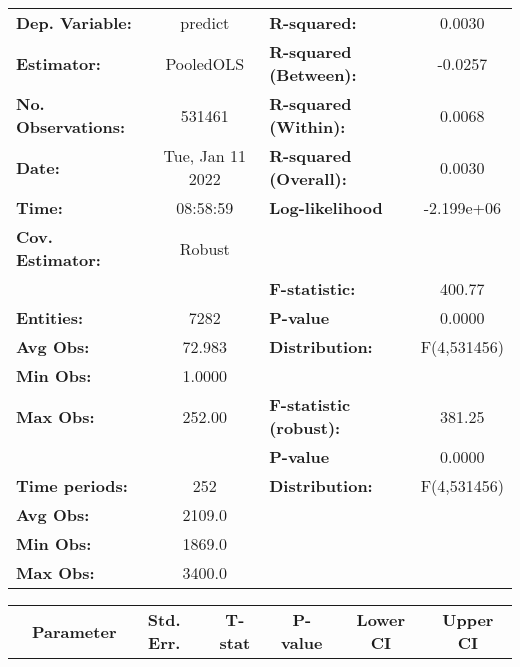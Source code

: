 \begin{center}
\begin{tabular}{lclc}
\toprule
\textbf{Dep. Variable:}    &      predict       & \textbf{  R-squared:         }   &      0.0030      \\
\textbf{Estimator:}        &     PooledOLS      & \textbf{  R-squared (Between):}  &     -0.0257      \\
\textbf{No. Observations:} &       531461       & \textbf{  R-squared (Within):}   &      0.0068      \\
\textbf{Date:}             &  Tue, Jan 11 2022  & \textbf{  R-squared (Overall):}  &      0.0030      \\
\textbf{Time:}             &      08:58:59      & \textbf{  Log-likelihood     }   &    -2.199e+06    \\
\textbf{Cov. Estimator:}   &       Robust       & \textbf{                     }   &                  \\
\textbf{}                  &                    & \textbf{  F-statistic:       }   &      400.77      \\
\textbf{Entities:}         &        7282        & \textbf{  P-value            }   &      0.0000      \\
\textbf{Avg Obs:}          &       72.983       & \textbf{  Distribution:      }   &   F(4,531456)    \\
\textbf{Min Obs:}          &       1.0000       & \textbf{                     }   &                  \\
\textbf{Max Obs:}          &       252.00       & \textbf{  F-statistic (robust):} &      381.25      \\
\textbf{}                  &                    & \textbf{  P-value            }   &      0.0000      \\
\textbf{Time periods:}     &        252         & \textbf{  Distribution:      }   &   F(4,531456)    \\
\textbf{Avg Obs:}          &       2109.0       & \textbf{                     }   &                  \\
\textbf{Min Obs:}          &       1869.0       & \textbf{                     }   &                  \\
\textbf{Max Obs:}          &       3400.0       & \textbf{                     }   &                  \\
\bottomrule
\end{tabular}
\begin{tabular}{lcccccc}
                & \textbf{Parameter} & \textbf{Std. Err.} & \textbf{T-stat} & \textbf{P-value} & \textbf{Lower CI} & \textbf{Upper CI}  \\

\end{tabular}
\end{center}
